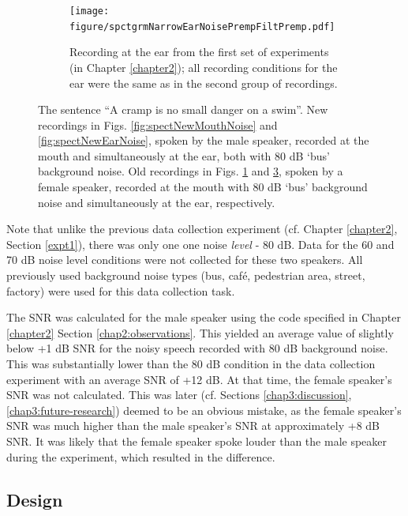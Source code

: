 \begin{figure}[h!]
\begin{subfigure}{0.45\textwidth}
  \label{fig:spectOldMouthNoise}
\end{subfigure}
\qquad
\begin{subfigure}{0.45\textwidth}
  \centering
  \texttt{[image: figure/spctgrmNarrowEarNoisePrempFiltPremp.pdf]}
  \caption{Recording at the ear from the first set of experiments (in Chapter \ref{chapter2}); all recording conditions for the ear were the same as in the second group of recordings.}
  \label{fig:spectOldEarNoise}
\end{subfigure}
\caption{The sentence ``A cramp is no small danger on a swim''. New recordings in Figs. \ref{fig:spectNewMouthNoise} and \ref{fig:spectNewEarNoise}, spoken by the male speaker, recorded at the mouth and simultaneously at the ear, both with 80 dB `bus' background noise.  Old recordings in Figs. \ref{fig:spectOldMouthNoise} and \ref{fig:spectOldEarNoise}, spoken by a female speaker, recorded at the mouth with 80 dB `bus' background noise and simultaneously at the ear, respectively.}
\end{figure}

Note that unlike the previous data collection experiment (cf. Chapter \ref{chapter2}, Section \ref{expt1}), there was only one one noise \textit{level} - 80 dB.  Data for the 60 and 70 dB noise level conditions were not collected for these two speakers.  All previously used background noise types (bus, caf\'{e}, pedestrian area, street, factory) were used for this data collection task.

The SNR was calculated for the male speaker using the code specified in Chapter \ref{chapter2} Section \ref{chap2:observations}.  This yielded an average value of slightly below +1 dB SNR for the noisy speech recorded with 80 dB background noise.  This was substantially lower than the 80 dB condition in the data collection experiment with an average SNR of +12 dB.  At that time, the female speaker's SNR was not calculated.  This was later (cf. Sections \ref{chap3:discussion}, \ref{chap3:future-research}) deemed to be an obvious mistake, as the female speaker's SNR was much higher than the male speaker's SNR at approximately +8 dB SNR.  It was likely that the female speaker spoke louder than the male speaker during the experiment, which resulted in the difference.


\subsection{Design}
\label{chap3:methods:design}

